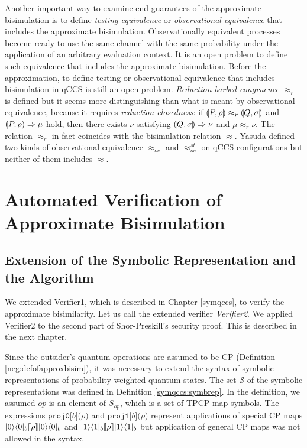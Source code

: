 Another important way to examine end guarantees of the approximate
bisimulation is to define \emph{testing equivalence}
\cite{DeNicola1984, Deng2009}
or \emph{observational equivalence} 
\cite{Blanchet2008cryptoverif, Yasuda2014} that includes the
approximate bisimulation. Observationally equivalent processes
become ready to use the same channel with the same probability
under the application of an arbitrary evaluation context.
It is an open problem to define such equivalence that
includes the approximate bisimulation.
Before the approximation,
to define testing or observational equivalence that includes
bisimulation in qCCS is still an open problem.
\emph{Reduction barbed congruence} $\approx_r$ is defined
\cite{DengFeng2012} but it
seems more distinguishing than what is meant by observational
equivalence, because it
requires \emph{reduction closedness}:
if $\llparenthesis P, \rho \rrparenthesis \approx_r \llparenthesis Q, \sigma \rrparenthesis$ and $\llparenthesis P, \rho \rrparenthesis
\Rightarrow \mu$ hold, then there exists $\nu$ satisfying
$\llparenthesis Q, \sigma \rrparenthesis \Rightarrow \nu$ and $\mu \approx_r \nu$.
The relation $\approx_r$ in fact coincides with the bisimulation
relation $\approx$.
Yasuda defined two kinds of observational equivalence
$\approx_{\mathit{oe}}$ and $\approx_{\mathit{oe}}^{\mathit{st}}$
on qCCS configurations \cite{Yasuda2014} but neither of them includes
$\approx$.

\section{Automated Verification of Approximate Bisimulation}
\subsection{Extension of the Symbolic Representation and  the Algorithm}
\label{neg:extensionofalgorithm}
We extended Verifier1, which is described in 
Chapter \ref{symqccs}, to verify the approximate bisimilarity.
Let us call the extended verifier \emph{Verifier2}.
We applied Verifier2 to the second part of
Shor-Preskill's security proof. This is described in the next chapter.

Since the outsider's quantum operations are assumed 
to be CP (Definition \ref{neg:defofapproxbisim}),
it was necessary to extend the syntax of symbolic representations of
probability-weighted quantum states. The set $\mathcal{S}$ of the symbolic
representations was defined in Definition \ref{symqccs:symbrep}.
In the definition, we assumed $\mathit{op}$ is an element of 
$S_{\mathit{op}}$, which is a set of TPCP map symbols.
The expressions 
$\mathtt{proj0}\mathtt{[}b\mathtt{](}\rho\mathtt{)}$ and
$\mathtt{proj1}\mathtt{[}b\mathtt{](}\rho\mathtt{)}$ 
represent applications of special CP maps
$|0\rangle\langle 0|_b[\![\rho]\!]|0\rangle\langle 0|_b$ and
$|1\rangle\langle 1|_b[\![\rho]\!]|1\rangle\langle 1|_b$
but application of general CP maps
was not allowed in the syntax.

